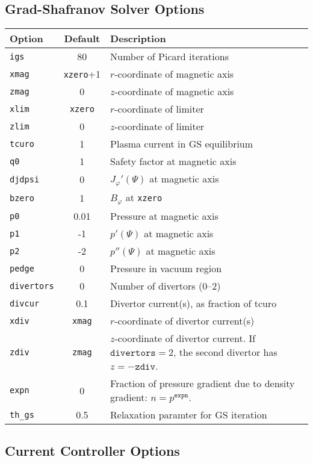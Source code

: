 \documentclass[letterpaper]{book}
\newcommand{\tor}{\varphi}              %
\begin{document}
\subsection{Grad-Shafranov Solver Options}
\begin{tabular}{lcl}
  \textbf{Option}&\textbf{Default}&\textbf{Description}\\
  \hline
  \texttt{igs}   & 80     & Number of Picard iterations\\
  \texttt{xmag}  & \texttt{xzero}+1 & $r$-coordinate of magnetic axis\\
  \texttt{zmag}  & 0      & $z$-coordinate of magnetic axis\\
  \texttt{xlim}  & \texttt{xzero}   & $r$-coordinate of limiter\\
  \texttt{zlim}  & 0      & $z$-coordinate of limiter\\
  \texttt{tcuro} & 1      & Plasma current in GS equilibrium\\
  \texttt{q0}    & 1      & Safety factor at magnetic axis\\
  \texttt{djdpsi}& 0      & $J_\tor'(\Psi)$ at magnetic axis\\
  \texttt{bzero} & 1      & $B_\tor$ at \texttt{xzero}\\
  \texttt{p0}    & 0.01   & Pressure at magnetic axis\\
  \texttt{p1}    & -1     & $p'(\Psi)$ at magnetic axis\\
  \texttt{p2}    & -2     & $p''(\Psi)$ at magnetic axis\\
  \texttt{pedge} & 0      & Pressure in vacuum region\\
  \texttt{divertors} & 0  & Number of divertors (0--2)\\
  \texttt{divcur}& 0.1    & Divertor current(s), as fraction of tcuro\\
  \texttt{xdiv}  & \texttt{xmag} & $r$-coordinate of divertor current(s)\\
  \texttt{zdiv}  & \texttt{zmag} & \parbox[t]{3in}{$z$-coordinate of 
    divertor 
    current.  If $\mathtt{divertors} = 2$, the second divertor has 
    $z = -\mathtt{zdiv}$.}\\
  \texttt{expn}  & 0 & \parbox[t]{3in}{Fraction of pressure gradient due to
    density gradient: $n = p^\mathtt{expn}$.}\\
  \texttt{th\_gs} & 0.5 & Relaxation paramter for GS iteration
\end{tabular}


\subsection{Current Controller Options}
\end{document}
